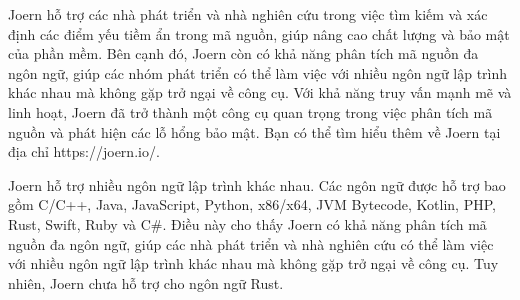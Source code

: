 Joern hỗ trợ các nhà phát triển và nhà nghiên cứu trong việc tìm kiếm và xác định các điểm yếu tiềm ẩn trong mã nguồn, giúp nâng cao chất lượng và bảo mật của phần mềm.
Bên cạnh đó, Joern còn có khả năng phân tích mã nguồn đa ngôn ngữ, giúp các nhóm phát triển có thể làm việc với nhiều ngôn ngữ lập trình khác nhau mà không gặp trở ngại về công cụ.
Với khả năng truy vấn mạnh mẽ và linh hoạt, Joern đã trở thành một công cụ quan trọng trong việc phân tích mã nguồn và phát hiện các lỗ hổng bảo mật.
Bạn có thể tìm hiểu thêm về Joern tại địa chỉ https://joern.io/.

Joern hỗ trợ nhiều ngôn ngữ lập trình khác nhau.
Các ngôn ngữ được hỗ trợ bao gồm C/C++, Java, JavaScript, Python, x86/x64, JVM Bytecode, Kotlin, PHP, Rust, Swift, Ruby và C\#.
Điều này cho thấy Joern có khả năng phân tích mã nguồn đa ngôn ngữ, giúp các nhà phát triển và nhà nghiên cứu có thể làm việc với nhiều ngôn ngữ lập trình khác nhau mà không gặp trở ngại về công cụ.
Tuy nhiên, Joern chưa hỗ trợ cho ngôn ngữ Rust.
